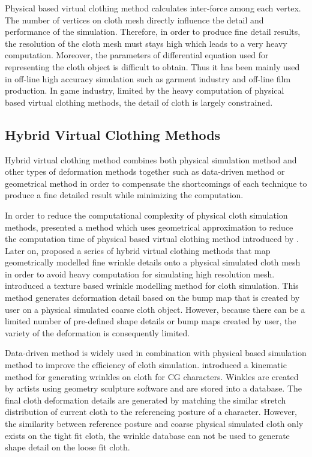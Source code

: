 Physical based virtual clothing method calculates inter-force among each vertex. The number of vertices on cloth mesh directly influence the detail and performance of the simulation. Therefore, in order to produce fine detail results, the resolution of the cloth mesh must stays high which leads to a very heavy computation. Moreover, the parameters of differential equation used for representing the cloth object is difficult to obtain. Thus it has been mainly used in off-line high accuracy simulation such as garment industry and off-line film production. In game industry, limited by the heavy computation of physical based virtual clothing methods, the detail of cloth is largely constrained.

\subsection{Hybrid Virtual Clothing Methods}

Hybrid virtual clothing method combines both physical simulation method and other types of deformation methods together such as data-driven method or geometrical method in order to compensate the shortcomings of each technique to produce a fine detailed result while minimizing the computation. 

In order to reduce the computational complexity of physical cloth simulation methods,  presented a method which uses geometrical approximation to reduce the computation time of physical based virtual clothing method introduced by . Later on,  proposed a series of hybrid virtual clothing methods that map geometrically modelled fine wrinkle details onto a physical simulated cloth mesh in order to avoid heavy computation for simulating high resolution mesh.  introduced a texture based wrinkle modelling method for cloth simulation. This method generates deformation detail based on the bump map that is created by user on a physical simulated coarse cloth object. However, because there can be a limited number of pre-defined shape details or bump maps created by user, the variety of the deformation is consequently limited. 

Data-driven method is widely used in combination with physical based simulation method to improve the efficiency of cloth simulation.  introduced a kinematic method for generating wrinkles on cloth for CG characters. Winkles are created by artists using geometry sculpture software and are stored into a database. The final cloth deformation details are generated by matching the similar stretch distribution of current cloth to the referencing posture of a character. However, the similarity between reference posture and coarse physical simulated cloth only exists on the tight fit cloth, the wrinkle database can not be used to generate shape detail on the loose fit cloth.
 
